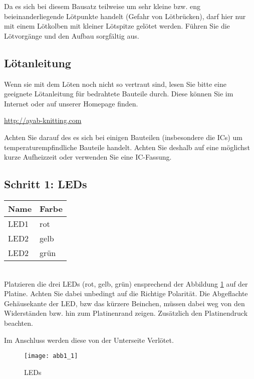 \documentclass[fleqn,10pt]{SelfArx} %
\begin{document}
Da es sich bei diesem Bausatz teilweise um sehr kleine bzw. eng beieinanderliegende Lötpunkte handelt (Gefahr von Lötbrücken), darf hier nur mit einem Lötkolben mit kleiner Lötspitze gelötet werden. Führen Sie die Lötvorgänge und den Aufbau sorgfältig aus.

 \subsection*{Lötanleitung}

Wenn sie mit dem Löten noch nicht so vertraut sind, lesen Sie bitte eine geeignete Lötanleitung für bedrahtete Bauteile durch. Diese können Sie im Internet oder auf unserer Homepage finden.

\url{http://ayab-knitting.com}

Achten Sie darauf des es sich bei einigen Bauteilen (insbesondere die ICs) um temperaturempfindliche Bauteile handelt. Achten Sie deshalb auf eine möglichst kurze Aufheizzeit oder verwenden Sie eine IC-Fassung.

 \subsection*{Schritt 1: LEDs}


\begin{tabular}{ll}
\hline
\textbf{Name} & \textbf{Farbe} \\ \hline
LED1          & rot            \\ \hline
LED2          & gelb           \\ \hline
LED2          & grün           \\ \hline
\end{tabular}\\

Platzieren die drei LEDs (rot, gelb, grün) ensprechend der Abbildung \ref{fig:abb1_1} auf der Platine. Achten Sie dabei unbedingt auf die Richtige Polarität. Die Abgeflachte Gehäusekante der LED, bzw das kürzere Beinchen, müssen dabei weg von den Widerständen bzw. hin zum Platinenrand zeigen. Zusätzlich den Platinendruck beachten.

Im Anschluss werden diese von der Unterseite Verlötet.

\begin{figure}[tbhp]\centering
\texttt{[image: abb1\_1]}
\caption{LEDs}
\label{fig:abb1_1}
\end{figure}

\FloatBarrier
\end{document}
